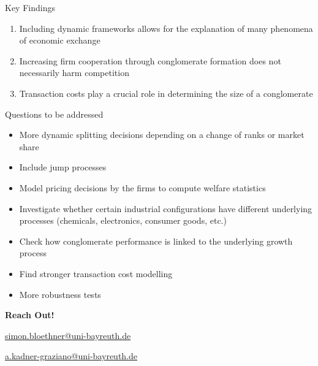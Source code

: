 \documentclass[aspectratio=169]{beamer}
\begin{document}
\begin{frame}{Key Findings}
  
  \begin{enumerate}
    \setlength\itemsep{0.8em}
    \item Including dynamic frameworks allows for the explanation of many phenomena of economic exchange
    \item Increasing firm cooperation through conglomerate formation does not necessarily harm competition
    \item Transaction costs play a crucial role in determining the size of a conglomerate
  \end{enumerate}

\end{frame}

\begin{frame}{Questions to be addressed}
    \begin{itemize}
        \item More dynamic splitting decisions depending on a change of ranks or market share
        \item Include jump processes
        \item Model pricing decisions by the firms to compute welfare statistics
        \item Investigate whether certain industrial configurations have different underlying processes (chemicals, electronics, consumer goods, etc.)
        \item Check how conglomerate performance is linked to the underlying growth process
        \item Find stronger transaction cost modelling 
        \item More robustness tests
    \end{itemize}
\end{frame}


\begin{frame}
    \centering

\textbf{\Huge Reach Out!}

\medskip

\vspace{1.5cm}

\href{mailto:simon.bloethner@uni-bayreuth.de}{simon.bloethner@uni-bayreuth.de}

\medskip

\vspace{.5cm}

\href{mailto:a.kadner-graziano@uni-bayreuth.de}{a.kadner-graziano@uni-bayreuth.de}
\end{frame}
\end{document}
